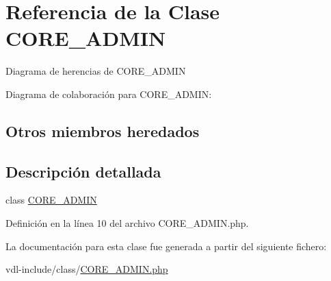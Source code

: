 \hypertarget{classCORE__ADMIN}{\section{Referencia de la Clase C\-O\-R\-E\-\_\-\-A\-D\-M\-I\-N}
\label{classCORE__ADMIN}
}


Diagrama de herencias de C\-O\-R\-E\-\_\-\-A\-D\-M\-I\-N


Diagrama de colaboración para C\-O\-R\-E\-\_\-\-A\-D\-M\-I\-N\-:
\subsection*{Otros miembros heredados}


\subsection{Descripción detallada}
class \hyperlink{classCORE__ADMIN}{C\-O\-R\-E\-\_\-\-A\-D\-M\-I\-N} 

Definición en la línea 10 del archivo C\-O\-R\-E\-\_\-\-A\-D\-M\-I\-N.\-php.



La documentación para esta clase fue generada a partir del siguiente fichero\-:\begin{DoxyCompactItemize}
\item 
vdl-\/include/class/\hyperlink{CORE__ADMIN_8php}{C\-O\-R\-E\-\_\-\-A\-D\-M\-I\-N.\-php}\end{DoxyCompactItemize}

